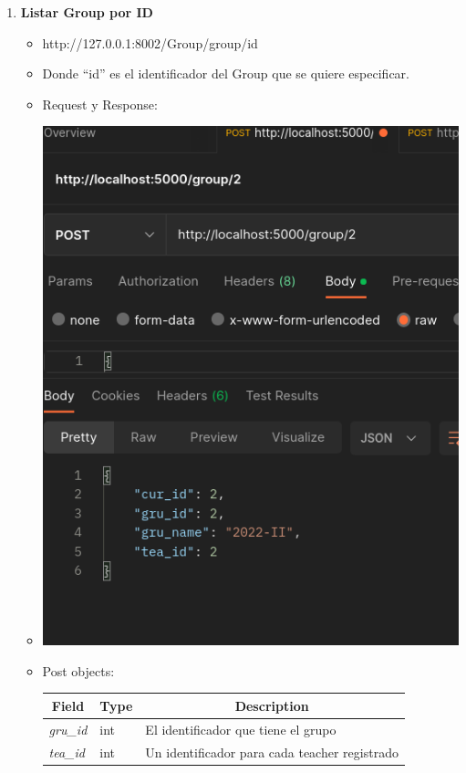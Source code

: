 \documentclass{article}
\begin{document}
\begin{enumerate}
    \item \textbf{Listar Group por ID}
    \begin{itemize}
        \item http://127.0.0.1:8002/Group/group/id
        \item Donde ``id'' es el identificador del Group que se quiere
        especificar.
        \item Request y Response:
        \item \includegraphics[scale=.5]{assets/group/group2.png}
        \item Post objects:
        \begin{table}[H] \centering \begin{tabular}{|l|l|l|} \hline
        \multicolumn{1}{|c|}{\textbf{Field}} &
        \multicolumn{1}{c|}{\textbf{Type}} &
        \multicolumn{1}{c|}{\textbf{Description}} \\ \hline \textit{gru\_id} &
        int & El identificador que tiene el grupo \\ \hline \textit{tea\_id} &
        int & Un identificador para cada teacher registrado \\ \hline

\end{tabular}
\end{table}
\end{itemize}
\end{enumerate}
\end{document}
